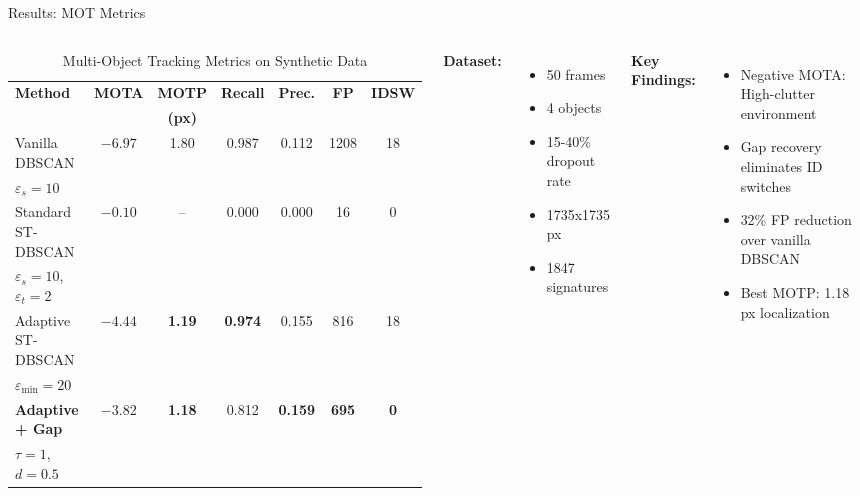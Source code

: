 \documentclass[aspectratio=169, 10pt]{beamer}
\begin{document}
\begin{frame}{Results: MOT Metrics}
\scriptsize
\begin{columns}[T]
\begin{table}
\centering
\tiny
\caption{Multi-Object Tracking Metrics on Synthetic Data}
\begin{tabular}{@{}lcccccc@{}}
\toprule
\textbf{Method} & \textbf{MOTA} & \textbf{MOTP} & \textbf{Recall} & \textbf{Prec.} & \textbf{FP} & \textbf{IDSW} \\
& & \textbf{(px)} & & & & \\
\midrule
Vanilla DBSCAN & $-6.97$ & 1.80 & 0.987 & 0.112 & 1208 & 18 \\
$\varepsilon_s=10$ & & & & & & \\[0.05cm]
Standard ST-DBSCAN & $-0.10$ & -- & 0.000 & 0.000 & 16 & 0 \\
$\varepsilon_s=10$, $\varepsilon_t=2$ & & & & & & \\[0.05cm]
Adaptive ST-DBSCAN & \textbf{$-4.44$} & \textbf{1.19} & \textbf{0.974} & 0.155 & 816 & 18 \\
$\varepsilon_{\min}=20$ & & & & & & \\[0.05cm]
\textcolor{Congaree}{\textbf{Adaptive + Gap}} & \textcolor{Congaree}{$-3.82$} & \textcolor{Congaree}{\textbf{1.18}} & \textcolor{Congaree}{0.812} & \textcolor{Congaree}{\textbf{0.159}} & \textcolor{Congaree}{\textbf{695}} & \textcolor{Congaree}{\textbf{0}} \\
\textcolor{Congaree}{$\tau=1$, $d=0.5$} & & & & & & \\
\bottomrule
\end{tabular}
\end{table}

\textbf{Dataset:}
\begin{itemize}
  \setlength{\itemsep}{0pt}
  \item 50 frames
  \item 4 objects
  \item 15-40\% dropout rate
  \item 1735x1735 px
  \item 1847 signatures
\end{itemize}

\vspace{0.2cm}
\textbf{Key Findings:}
\begin{itemize}
  \setlength{\itemsep}{0pt}
  \item \textcolor{Rose}{Negative MOTA:} High-clutter environment
  \item \textcolor{Congaree}{Gap recovery eliminates ID switches}
  \item \textcolor{Congaree}{32\% FP reduction over vanilla DBSCAN}
  \item \textcolor{Congaree}{Best MOTP: 1.18 px localization}
\end{itemize}
\end{columns}
\end{frame}
\end{document}
